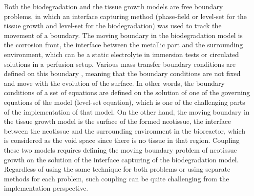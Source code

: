 Both the biodegradation and the tissue growth models are free boundary problems, in which an interface capturing method (phase-field or level-set for the tissue growth and level-set for the biodegradation) was used to track the movement of a boundary. The moving boundary in the biodegradation model is the corrosion front, the interface between the metallic part and the surrounding environment, which can be a static electrolyte in immersion tests or circulated solutions in a perfusion setup. Various mass transfer boundary conditions are defined on this boundary \cite{Barzegari2021}, meaning that the boundary conditions are not fixed and move with the evolution of the surface. In other words, the boundary conditions of a set of equations are defined on the solution of one of the governing equations of the model (level-set equation), which is one of the challenging parts of the implementation of that model. On the other hand, the moving boundary in the tissue growth model is the surface of the formed neotissue, the interface between the neotissue and the surrounding environment in the bioreactor, which is considered as the void space since there is no tissue in that region. Coupling these two models requires defining the moving boundary problem of neotissue growth on the solution of the interface capturing of the biodegradation model. Regardless of using the same technique for both problems or using separate methods for each problem, such coupling can be quite challenging from the implementation perspective.

